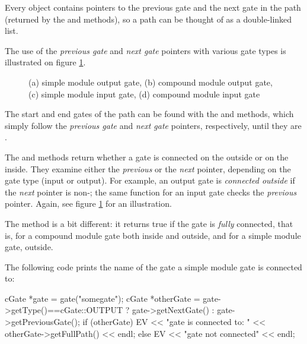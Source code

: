 \begin{ned}
Every  object contains pointers to the previous gate
and the next gate in the path (returned by the 
and  methods), so a path can be thought of as
a double-linked list.

The use of the \textit{previous gate} and \textit{next gate} pointers
with various gate types is illustrated on figure
\ref{fig:ch-simple-modules:gates}.

\begin{figure}[htbp]
  \begin{center}
    
    \caption{(a) simple module output gate, (b) compound module output gate,
             (c) simple module input gate, (d) compound module input gate}
    \label{fig:ch-simple-modules:gates}
  \end{center}
\end{figure}

The start and end gates of the path can be found with the 
and  methods, which simply follow the \textit{previous gate} and
\textit{next gate} pointers, respectively, until they are .

The  and  methods
return whether a gate is connected on the outside or on the inside. They
examine either the \textit{previous} or the \textit{next} pointer, depending on the
gate type (input or output). For example, an output gate is \textit{connected outside}
if the \textit{next} pointer is non-; the same function for an input gate
checks the \textit{previous} pointer. Again, see figure \ref{fig:ch-simple-modules:gates}
for an illustration.

The  method is a bit different: it returns true if the gate
is \textit{fully} connected, that is, for a compound module gate
both inside and outside, and for a simple module gate, outside.

The following code prints the name of the gate a simple module gate is
connected to:

\begin{cpp}
cGate *gate = gate("somegate");
cGate *otherGate = gate->getType()==cGate::OUTPUT ? gate->getNextGate() :
                                                    gate->getPreviousGate();
if (otherGate)
  EV << "gate is connected to: " << otherGate->getFullPath() << endl;
else
  EV << "gate not connected" << endl;
\end{cpp}



\end{ned}
